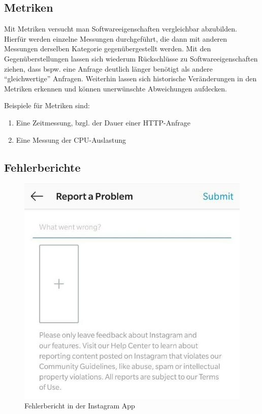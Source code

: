 \subsection{Metriken}

Mit Metriken versucht man Softwareeigenschaften vergleichbar abzubilden. Hierfür werden einzelne Messungen durchgeführt, die dann mit anderen Messungen derselben Kategorie gegenübergestellt werden. Mit den Gegenüberstellungen lassen sich wiederum Rückschlüsse zu Softwareeigenschaften ziehen, dass bspw. eine Anfrage deutlich länger benötigt als andere \enquote{gleichwertige} Anfragen. Weiterhin lassen sich historische Veränderungen in den Metriken erkennen und können unerwünschte Abweichungen aufdecken.

Beispiele für Metriken sind:

\begin{enumerate}
	\item Eine Zeitmessung, bzgl. der Dauer einer HTTP-Anfrage
	\item Eine Messung der CPU-Auslastung
\end{enumerate}


\subsection{Fehlerberichte}

\begin{figure}
\centering
\vspace{-\baselineskip}
\includegraphics[width=\linewidth]{img/instagram-feedback/instagram-feedback.jpg}
\caption{Fehlerbericht in der Instagram App \cite{Instagram}}
\label{fig:instagram-bug-report}
\end{figure}

